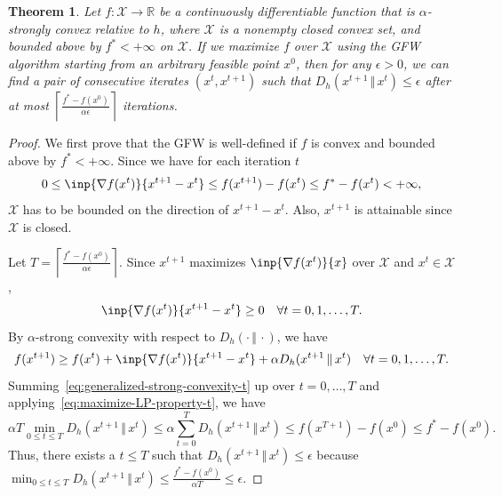 \documentclass[format=acmsmall,authorversion]{acmart}
\newtheorem{theorem}{Theorem}
\newcommand{\ck}[1]{{\textcolor{red}{CK: #1}}}
\begin{document}

\begin{theorem}
    Let $f: \mathcal X \rightarrow \mathbb{R}$ be a continuously differentiable function that is $\alpha$-strongly convex relative to $h$, where $\mathcal X$ is a nonempty closed convex set, and bounded above by $f^* < +\infty$ on $\mathcal{X}$. 
    If we maximize $f$ over $\mathcal X$ using the GFW algorithm starting from an arbitrary feasible point $x^0$, then for any $\epsilon > 0$, we can find a pair of consecutive iterates $(x^t, x^{t+1})$ such that $D_h(x^{t+1}\,\Vert\,x^t) \leq \epsilon$ after at most 
    $\left\lceil\frac{f^* - f(x^0)}{\alpha\epsilon}\right\rceil$ iterations. 
    \label{thm:stepsize-convergence-under-generalized-strong-convexity}
\end{theorem}

\begin{proof}
    We first prove that the GFW is well-defined if $f$ is convex and bounded above by $f^* < +\infty$. 
    Since we have for each iteration $t$  
    \begin{equation}
        0 \leq \inp{\nabla f(x^t)}{x^{t+1} - x^t} \leq f(x^{t+1}) - f(x^t) \leq f^* - f(x^t) < +\infty,
    \end{equation}
    $\mathcal{X}$ has to be bounded on the direction of $x^{t+1} - x^t$. Also, $x^{t+1}$ is attainable since $\mathcal{X}$ is closed. 

    Let $T = \left\lceil \frac{f^* - f(x^0)}{\alpha\epsilon}\right\rceil$.
    Since $x^{t+1}$ maximizes $\inp{\nabla f(x^t)}{x}$ over $\mathcal X$ and $x^t \in \mathcal X$, 
    \begin{equation}
        \inp{\nabla f(x^t)}{x^{t+1} - x^t} \geq 0 \quad \forall t = 0, 1, \ldots, T.
        \label{eq:maximize-LP-property-t}
    \end{equation}
    By $\alpha$-strong convexity with respect to $D_h(\cdot\,\Vert\,\cdot)$, we have 
    \begin{equation}
        f(x^{t+1}) \geq f(x^t) + \inp{\nabla f(x^t)}{x^{t+1} - x^t} + \alpha D_h(x^{t+1}\,\Vert\,x^t) \quad \forall t = 0, 1, \ldots, T. 
        \label{eq:generalized-strong-convexity-t}
    \end{equation}
    Summing~\cref{eq:generalized-strong-convexity-t} up over $t = 0, \ldots,T$ and applying~\cref{eq:maximize-LP-property-t}, we have 
    \begin{equation}
        \alpha T \min_{0 \leq t \leq T} D_h(x^{t+1}\,\Vert\,x^t) \leq \alpha \sum_{t=0}^T D_h(x^{t+1}\,\Vert\,x^t) \leq f(x^{T+1}) - f(x^0) \leq f^* - f(x^0). 
    \end{equation}
    Thus, there exists a $t \leq T$ such that $D_h(x^{t+1}\,\Vert\,x^t) \leq \epsilon$ because $\min_{0 \leq t \leq T} D_h(x^{t+1}\,\Vert\,x^t) \leq \frac{f^* - f(x^0)}{\alpha T} \leq \epsilon$. 
\end{proof}
\end{document}
